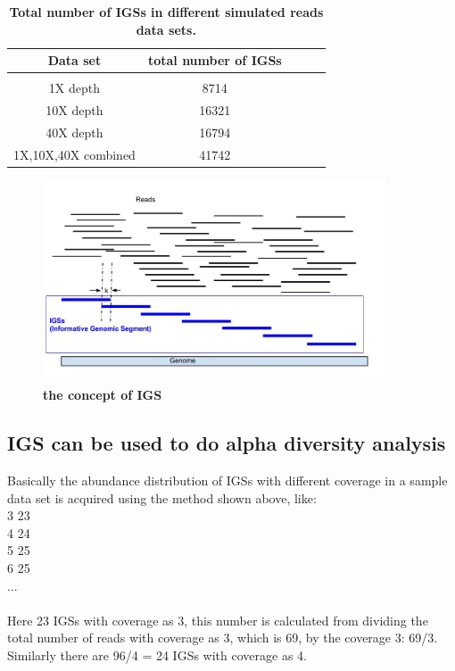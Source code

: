 \documentclass{article}
\begin{document}
\begin{table}[!ht]
\caption{
\bf{Total number of IGSs in different simulated reads data sets.}
}
\begin{tabular}{ |c | c |c| c|c| }
Data set & total number of IGSs \\
\hline \\
1X depth                   & 8714  \\
10X depth                  & 16321  \\
40X depth                  & 16794 \\
1X,10X,40X combined        & 41742 \\
\end{tabular}
\begin{flushleft}
\end{flushleft}
\label{table:IGSs}
\end{table}


\begin{figure}[!ht]
\centerline{\includegraphics[width=4in]{./figures/IGSs_figure.jpg}}
\caption{\bf the concept of IGS}
\label{fig:IGS}
\end{figure}





\subsection{IGS can be used to do alpha diversity analysis}

Basically the abundance distribution of IGSs with different coverage in a sample data set is acquired using the method shown above, like:
\\
3 23\\
4 24\\
5 25\\
6 25\\
...\\
\\
Here 23 IGSs with coverage as 3, this number is calculated from dividing the total number of reads with coverage as 3, which is 69, by the coverage 3: 69/3. Similarly there are 96/4 = 24 IGSs with coverage as 4.
\end{document}
